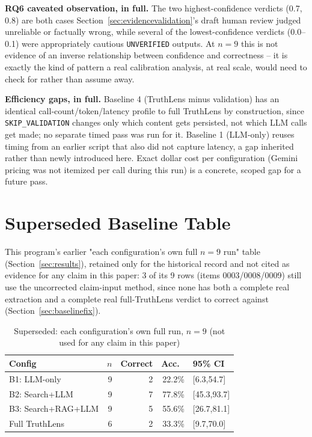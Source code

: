 \documentclass[conference]{IEEEtran}
\begin{document}
\textbf{RQ6 caveated observation, in full.} The two highest-confidence
verdicts (0.7, 0.8) are both cases Section~\ref{sec:evidencevalidation}'s
draft human review judged unreliable or factually wrong, while several
of the lowest-confidence verdicts (0.0--0.1) were appropriately cautious
\texttt{UNVERIFIED} outputs. At $n=9$ this is not evidence of an inverse
relationship between confidence and correctness -- it is exactly the
kind of pattern a real calibration analysis, at real scale, would need
to check for rather than assume away.

\textbf{Efficiency gaps, in full.} Baseline 4 (TruthLens minus
validation) has an identical call-count/token/latency profile to full
TruthLens by construction, since \texttt{SKIP\_VALIDATION} changes only
which content gets persisted, not which LLM calls get made; no separate
timed pass was run for it. Baseline 1 (LLM-only) reuses timing from an
earlier script that also did not capture latency, a gap inherited rather
than newly introduced here. Exact dollar cost per configuration (Gemini
pricing was not itemized per call during this run) is a concrete, scoped
gap for a future pass.

\section{Superseded Baseline Table}
\label{sec:appendixsuperseded}
This program's earlier "each configuration's own full $n=9$ run" table
(Section~\ref{sec:results}), retained only for the historical record and
not cited as evidence for any claim in this paper: 3 of its 9 rows
(items 0003/0008/0009) still use the uncorrected claim-input method,
since none has both a complete real extraction and a complete real
full-TruthLens verdict to correct against (Section~\ref{sec:baselinefix}).
\begin{table}[!h]
\caption{Superseded: each configuration's own full run, $n=9$ (not used for any claim in this paper)}
\label{tab:table1old}
\centering
\scriptsize
\begin{tabular}{lrrrl}
\toprule
Config & $n$ & Correct & Acc.\ & 95\% CI \\
\midrule
B1: LLM-only & 9 & 2 & 22.2\% & [6.3,54.7] \\
B2: Search+LLM & 9 & 7 & 77.8\% & [45.3,93.7] \\
B3: Search+RAG+LLM & 9 & 5 & 55.6\% & [26.7,81.1] \\
Full TruthLens & 6 & 2 & 33.3\% & [9.7,70.0] \\
\bottomrule
\end{tabular}
\end{table}
\end{document}
